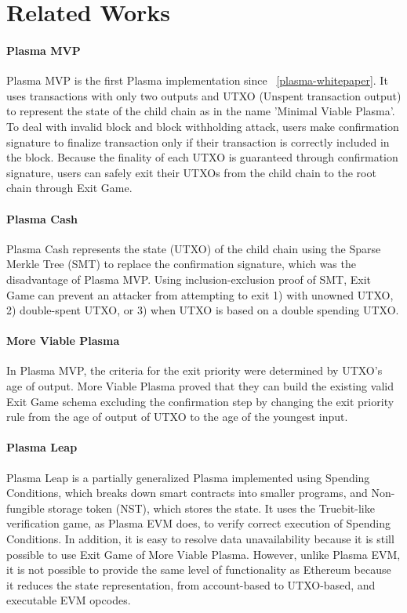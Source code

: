 \documentclass[letterpaper, 11pt]{article}
\begin{document}
\section{Related Works}
\begin{CJK}{UTF8}{mj}
\paragraph{Plasma MVP}
Plasma MVP is the first Plasma implementation since ~\ref{plasma-whitepaper}. It uses transactions with only two outputs and UTXO (Unspent transaction output) to represent the state of the child chain as in the name 'Minimal Viable Plasma’. To deal with invalid block and block withholding attack, users make confirmation signature to finalize transaction only if their transaction is correctly included in the block. Because the finality of each UTXO is guaranteed through confirmation signature, users can safely exit their UTXOs from the child chain to the root chain through Exit Game.


\paragraph{Plasma Cash}
Plasma Cash represents the state (UTXO) of the child chain using the Sparse Merkle Tree (SMT) to replace the confirmation signature, which was the disadvantage of Plasma MVP. Using inclusion-exclusion proof of SMT, Exit Game can prevent an attacker from attempting to exit 1) with unowned UTXO, 2) double-spent UTXO, or 3) when UTXO is based on a double spending UTXO.

\paragraph{More Viable Plasma}
In Plasma MVP, the criteria for the exit priority were determined by UTXO’s age of output. More Viable Plasma proved that they can build the existing valid Exit Game schema excluding the confirmation step by changing the exit priority rule from the age of output of UTXO to the age of the youngest input.

\paragraph{Plasma Leap}
Plasma Leap is a partially generalized Plasma implemented using Spending Conditions, which breaks down smart contracts into smaller programs, and Non-fungible storage token (NST), which stores the state. It uses the Truebit-like verification game, as Plasma EVM does, to verify correct execution of Spending Conditions. In addition, it is easy to resolve data unavailability because it is still possible to use Exit Game of More Viable Plasma. However, unlike Plasma EVM, it is not possible to provide the same level of functionality as Ethereum because it reduces the state representation, from account-based to UTXO-based, and executable EVM opcodes.
\end{CJK}
\end{document}
